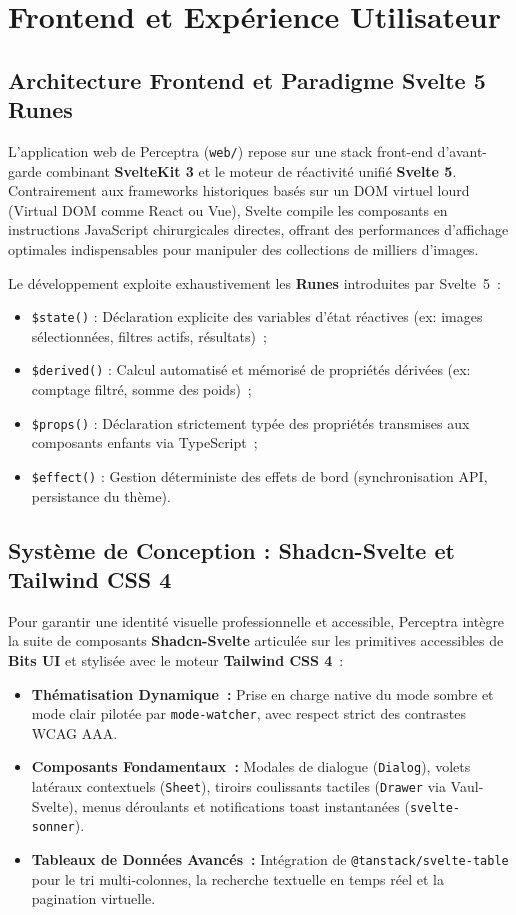 \chapter{Frontend et Expérience Utilisateur}
\label{chap:frontend}

\section{Architecture Frontend et Paradigme Svelte 5 Runes}

L'application web de Perceptra (\texttt{web/}) repose sur une stack front-end d'avant-garde combinant \textbf{SvelteKit 3} et le moteur de réactivité unifié \textbf{Svelte 5}. Contrairement aux frameworks historiques basés sur un DOM virtuel lourd (Virtual DOM comme React ou Vue), Svelte compile les composants en instructions JavaScript chirurgicales directes, offrant des performances d'affichage optimales indispensables pour manipuler des collections de milliers d'images.

Le développement exploite exhaustivement les \textbf{Runes} introduites par Svelte~5~:
\begin{itemize}
    \item \texttt{\$state()} : Déclaration explicite des variables d'état réactives (ex: images sélectionnées, filtres actifs, résultats)~;
    \item \texttt{\$derived()} : Calcul automatisé et mémorisé de propriétés dérivées (ex: comptage filtré, somme des poids)~;
    \item \texttt{\$props()} : Déclaration strictement typée des propriétés transmises aux composants enfants via TypeScript~;
    \item \texttt{\$effect()} : Gestion déterministe des effets de bord (synchronisation API, persistance du thème).
\end{itemize}

\section{Système de Conception : Shadcn-Svelte et Tailwind CSS 4}

Pour garantir une identité visuelle professionnelle et accessible, Perceptra intègre la suite de composants \textbf{Shadcn-Svelte} articulée sur les primitives accessibles de \textbf{Bits UI} et stylisée avec le moteur \textbf{Tailwind CSS 4}~:
\begin{itemize}
    \item \textbf{Thématisation Dynamique~:} Prise en charge native du mode sombre et mode clair pilotée par \texttt{mode-watcher}, avec respect strict des contrastes WCAG AAA.
    \item \textbf{Composants Fondamentaux~:} Modales de dialogue (\texttt{Dialog}), volets latéraux contextuels (\texttt{Sheet}), tiroirs coulissants tactiles (\texttt{Drawer} via Vaul-Svelte), menus déroulants et notifications toast instantanées (\texttt{svelte-sonner}).
    \item \textbf{Tableaux de Données Avancés~:} Intégration de \texttt{@tanstack/svelte-table} pour le tri multi-colonnes, la recherche textuelle en temps réel et la pagination virtuelle.
\end{itemize}

